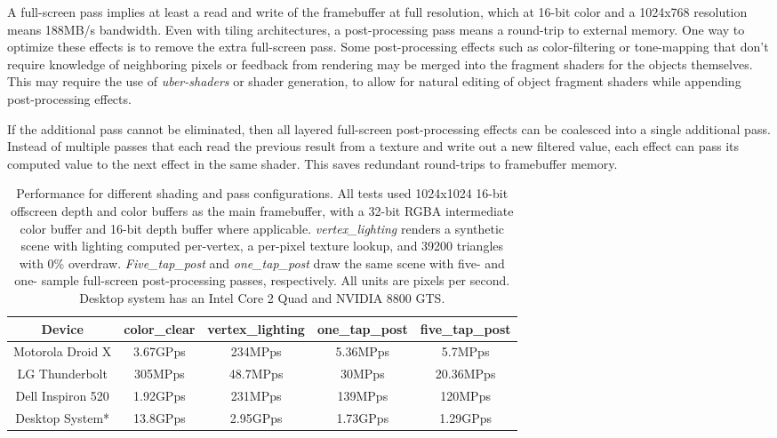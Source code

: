 A full-screen pass implies at least a read and write of the framebuffer at full
resolution, which at 16-bit color and a 1024x768 resolution means 188MB/s
bandwidth.  Even with tiling architectures, a post-processing pass
means a round-trip to external memory.  One way to optimize these effects is to
remove the extra full-screen pass.  Some post-processing effects such as
color-filtering or tone-mapping that don't require knowledge of neighboring
pixels or feedback from rendering may be merged into the fragment shaders for
the objects themselves.  This may require the use of \textit{uber-shaders} or
shader generation, to allow for natural editing of object fragment shaders
while appending post-processing effects.

If the additional pass cannot be eliminated, then all layered full-screen
post-processing effects can be coalesced into a single additional pass.
Instead of multiple passes that each read the previous result from a texture
and write out a new filtered value, each effect can pass its computed value to
the next effect in the same shader.  This saves redundant round-trips to
framebuffer memory.

\begin{table}[htb]\centering \begin{tabular}{|c||c|c|c|c|} 
\hline \small{Device} & \small{color\_clear} & \small{vertex\_lighting} & \small{one\_tap\_post} & \small{five\_tap\_post}  \\ \hline 
\hline \small{Motorola Droid X} & \small{3.67GPps} & \small{234MPps}& \small{5.36MPps\footnotemark[1]} & \small{5.7MPps\footnotemark[1]} \\ 
\hline \small{LG Thunderbolt} & \small{305MPps} & \small{48.7MPps}& \small{30MPps} & \small{20.36MPps} \\ 
\hline \small{Dell Inspiron 520} & \small{1.92GPps} & \small{231MPps}& \small{139MPps} & \small{120MPps} \\ 
\hline \small{Desktop System*} & \small{13.8GPps} & \small{2.95GPps}& \small{1.73GPps} & \small{1.29GPps} \\ 
\hline
\end{tabular} 
\caption{Performance for different shading and pass configurations.  All tests used 1024x1024 16-bit offscreen depth and color buffers as the main framebuffer, with a 32-bit RGBA intermediate color buffer and 16-bit depth buffer where applicable.  \textit{vertex\_lighting} renders a synthetic scene with lighting computed per-vertex, a per-pixel texture lookup, and 39200 triangles with 0\% overdraw.  \textit{Five\_tap\_post} and \textit{one\_tap\_post} draw the same scene with five- and one- sample full-screen post-processing passes, respectively.  All units are pixels per second.  Desktop system has an Intel Core 2 Quad and NVIDIA 8800 GTS.}
\label{JonMcCaffrey:pass_performance} \end{table}

